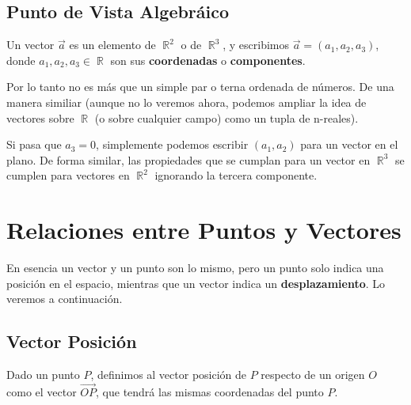 \documentclass[12pt, fleqn]{report}                             %
\DeclareMathOperator \Reals        {\mathbb{R}}                 %
\newcommand{\lVec}[1]{\overrightarrow{#1}}                      %
\begin{document}
            \subsection{Punto de Vista Algebráico}
            
                Un vector $\vec{a}$ es un elemento de $\Reals^2$ o de $\Reals^3$, y escribimos
                $\vec{a} = (a_1, a_2, a_3)$, donde $a_1, a_2, a_3 \in \Reals$ son sus
                \textbf{coordenadas} o \textbf{componentes}.

                Por lo tanto no es más que un simple par o terna ordenada de números. 
                De una manera similiar (aunque no lo veremos ahora, podemos ampliar la idea de vectores
                sobre $\Reals$ (o sobre cualquier campo) como un tupla de n-reales).

                Si pasa que $a_3 = 0$, simplemente podemos escribir $(a_1, a_2)$ para un vector en el plano.
                De forma similar, las propiedades que se cumplan para un vector en $\Reals^3$ se
                cumplen para vectores en $\Reals^2$ ignorando la tercera componente.

            
        \clearpage
        \section{Relaciones entre Puntos y Vectores}
        
            En esencia un vector y un punto son lo mismo, pero un punto solo indica una posición
            en el espacio, mientras que un vector indica un \textbf{desplazamiento}.
            Lo veremos a continuación.
            
            \subsection{Vector Posición}
            
                Dado un punto $P$, definimos al vector posición de $P$ respecto de un origen $O$ como
                el vector $\lVec{OP}$, que tendrá las mismas coordenadas del punto $P$.
            
\end{document}
